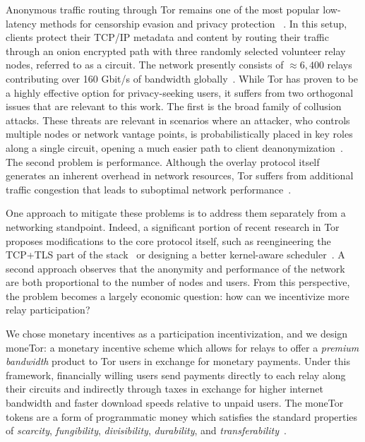 Anonymous traffic routing through Tor remains one of the most popular
low-latency methods for censorship evasion and privacy protection
~\cite{dingledine2004tor}. In this setup, clients protect their TCP/IP metadata
and content by routing their traffic through an onion encrypted path with three
randomly selected volunteer relay nodes, referred to as a circuit. The network
presently consists of $\approx 6,400$ relays contributing over 160 Gbit/s of
bandwidth globally~\cite{portal2018tormetrics}. While Tor has proven to be a
highly effective option for privacy-seeking users, it suffers from two
orthogonal issues that are relevant to this work. The first is the broad family
of collusion attacks. These threats are relevant in scenarios where an attacker,
who controls multiple nodes or network vantage points, is probabilistically
placed in key roles along a single circuit, opening a much easier path to client
deanonymization~\cite{wright2004predecessor,murdoch2005low}. The second problem
is performance. Although the overlay protocol itself generates an inherent
overhead in network resources, Tor suffers from additional traffic congestion
that leads to suboptimal network performance~\cite{portal2018tormetrics,
  alsabah2016performance}.

One approach to mitigate these problems is to address them separately from a
networking standpoint. Indeed, a significant portion of recent research in Tor
proposes modifications to the core protocol itself, such as reengineering the
TCP+TLS part of the stack~\cite{reardon2009improving} or designing a better
kernel-aware scheduler~\cite{jansen2014never}. A second approach observes that
the anonymity and performance of the network are both proportional to the number
of nodes and users. From this perspective, the problem becomes a largely
economic question: how can we incentivize more relay participation?

We chose monetary incentives as a participation incentivization, and we design moneTor: a monetary incentive scheme which allows for relays to offer a \emph{premium bandwidth} product
to Tor users in exchange for monetary payments. Under this framework,
financially willing users send payments directly to each relay along their circuits and indirectly through taxes
in exchange for higher internet bandwidth and faster download speeds relative to
unpaid users. %
The moneTor tokens %
are a form of programmatic money which satisfies the standard properties of
\textit{scarcity}, \textit{fungibility}, \textit{divisibility},
\textit{durability}, and
\textit{transferability}~\cite[p.3]{crump2011phenomenon}.

